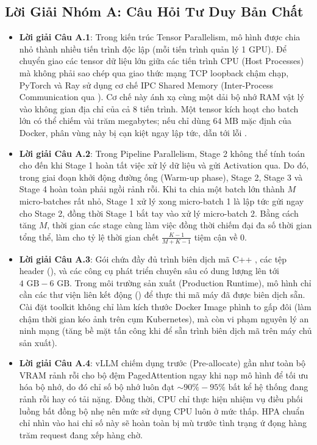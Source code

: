 \subsection{Lời Giải Nhóm A: Câu Hỏi Tư Duy Bản Chất}
\begin{itemize}
  \item \textbf{Lời giải Câu A.1}:
  Trong kiến trúc Tensor Parallelism, mô hình được chia nhỏ thành nhiều tiến trình độc lập (mỗi tiến trình quản lý 1 GPU). Để chuyển giao các tensor dữ liệu lớn giữa các tiến trình CPU (Host Processes) mà không phải sao chép qua giao thức mạng TCP loopback chậm chạp, PyTorch và Ray sử dụng cơ chế IPC Shared Memory (Inter-Process Communication qua ). Cơ chế này ánh xạ cùng một dải bộ nhớ RAM vật lý vào không gian địa chỉ của cả 8 tiến trình. Một tensor kích hoạt cho batch lớn có thể chiếm vài trăm megabytes; nếu chỉ dùng $64\text{ MB}$ mặc định của Docker, phân vùng này bị cạn kiệt ngay lập tức, dẫn tới lỗi .

  \item \textbf{Lời giải Câu A.2}:
  Trong Pipeline Parallelism, Stage 2 không thể tính toán cho đến khi Stage 1 hoàn tất việc xử lý dữ liệu và gửi Activation qua. Do đó, trong giai đoạn khởi động đường ống (Warm-up phase), Stage 2, Stage 3 và Stage 4 hoàn toàn phải ngồi rảnh rỗi. Khi ta chia một batch lớn thành $M$ micro-batches rất nhỏ, Stage 1 xử lý xong micro-batch 1 là lập tức gửi ngay cho Stage 2, đồng thời Stage 1 bắt tay vào xử lý micro-batch 2. Bằng cách tăng $M$, thời gian các stage cùng làm việc đồng thời chiếm đại đa số thời gian tổng thể, làm cho tỷ lệ thời gian chết $\frac{K-1}{M + K - 1}$ tiệm cận về $0$.

  \item \textbf{Lời giải Câu A.3}:
  Gói  chứa đầy đủ trình biên dịch mã C++ , các tệp header (), và các công cụ phát triển chuyên sâu có dung lượng lên tới $4\text{ GB} - 6\text{ GB}$. Trong môi trường sản xuất (Production Runtime), mô hình chỉ cần các thư viện liên kết động () để thực thi mã máy đã được biên dịch sẵn. Cài đặt toolkit không chỉ làm kích thước Docker Image phình to gấp đôi (làm chậm thời gian kéo ảnh trên cụm Kubernetes), mà còn vi phạm nguyên lý an ninh mạng (tăng bề mặt tấn công khi để sẵn trình biên dịch mã trên máy chủ sản xuất).

  \item \textbf{Lời giải Câu A.4}:
  vLLM chiếm dụng trước (Pre-allocate) gần như toàn bộ VRAM rảnh rỗi cho bộ đệm PagedAttention ngay khi nạp mô hình để tối ưu hóa bộ nhớ, do đó chỉ số bộ nhớ luôn đạt $\sim 90\%-95\%$ bất kể hệ thống đang rảnh rỗi hay có tải nặng. Đồng thời, CPU chỉ thực hiện nhiệm vụ điều phối luồng bất đồng bộ nhẹ nên mức sử dụng CPU luôn ở mức thấp. HPA chuẩn chỉ nhìn vào hai chỉ số này sẽ hoàn toàn bị mù trước tình trạng ứ đọng hàng trăm request đang xếp hàng chờ.


\end{itemize}
